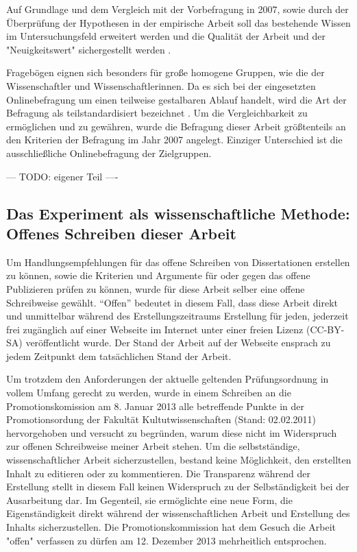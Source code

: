 Auf Grundlage und dem Vergleich mit der Vorbefragung in 2007, sowie durch der Überprüfung der Hypothesen in der empirische Arbeit soll das bestehende Wissen im Untersuchungsfeld erweitert werden und die Qualität der Arbeit und der "Neuigkeitswert" sichergestellt werden \cite{raab_2012_fragebogen}.

Fragebögen eignen sich besonders für große homogene Gruppen, wie die der Wissenschaftler und Wissenschaftlerinnen. Da es sich bei der eingesetzten Onlinebefragung um einen teilweise gestalbaren Ablauf handelt, wird die Art der Befragung als teilstandardisiert bezeichnet \cite{raab_2012_fragebogen}. Um die Vergleichbarkeit zu ermöglichen und zu gewähren, wurde die Befragung dieser Arbeit größtenteils an den Kriterien der Befragung im Jahr 2007 angelegt. Einziger Unterschied ist die ausschließliche Onlinebefragung der Zielgruppen.

--- TODO: eigener Teil ----

\subsection{Das Experiment als wissenschaftliche Methode: Offenes Schreiben dieser Arbeit}
Um Handlungsempfehlungen für das offene Schreiben von Dissertationen erstellen zu können, sowie die Kriterien und Argumente für oder gegen das offene Publizieren prüfen zu können, wurde für diese Arbeit selber eine offene Schreibweise gewählt. “Offen” bedeutet in diesem Fall, dass diese Arbeit direkt und unmittelbar während des Erstellungszeitraums Erstellung für jeden, jederzeit frei zugänglich auf einer Webseite im Internet unter einer freien Lizenz (CC-BY-SA) veröffentlicht wurde. Der Stand der Arbeit auf der Webseite ensprach zu jedem Zeitpunkt dem tatsächlichen Stand der Arbeit. 

Um trotzdem den Anforderungen der aktuelle geltenden Prüfungsordnung in vollem Umfang gerecht zu werden, wurde in einem Schreiben an die Promotionskomission am 8. Januar 2013 alle betreffende Punkte in der Promotionsordung der Fakultät Kultutwissenschaften (Stand: 02.02.2011) hervorgehoben und versucht zu begründen, warum diese nicht im Widerspruch zur offenen Schreibweise meiner Arbeit stehen. Um die selbstständige, wissenschaftlicher Arbeit sicherzustellen, bestand keine Möglichkeit, den erstellten Inhalt zu editieren oder zu kommentieren. Die Transparenz während der Erstellung stellt in diesem Fall keinen Widerspruch zu der Selbständigkeit bei der Ausarbeitung dar. Im Gegenteil, sie ermöglichte eine neue Form, die Eigenständigkeit direkt während der wissenschaftlichen Arbeit und Erstellung des Inhalts sicherzustellen. Die Promotionskommission hat dem Gesuch die Arbeit "offen" verfassen zu dürfen am 12. Dezember 2013 mehrheitlich entsprochen.

